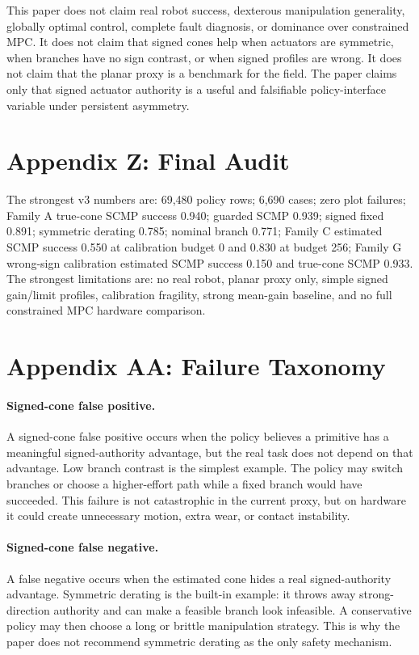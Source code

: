 \documentclass{article}
\begin{document}
This paper does not claim real robot success, dexterous manipulation generality, globally optimal control, complete fault diagnosis, or dominance over constrained MPC. It does not claim that signed cones help when actuators are symmetric, when branches have no sign contrast, or when signed profiles are wrong. It does not claim that the planar proxy is a benchmark for the field. The paper claims only that signed actuator authority is a useful and falsifiable policy-interface variable under persistent asymmetry.

\section{Appendix Z: Final Audit}

The strongest v3 numbers are: 69,480 policy rows; 6,690 cases; zero plot failures; Family A true-cone SCMP success 0.940; guarded SCMP 0.939; signed fixed 0.891; symmetric derating 0.785; nominal branch 0.771; Family C estimated SCMP success 0.550 at calibration budget 0 and 0.830 at budget 256; Family G wrong-sign calibration estimated SCMP success 0.150 and true-cone SCMP 0.933. The strongest limitations are: no real robot, planar proxy only, simple signed gain/limit profiles, calibration fragility, strong mean-gain baseline, and no full constrained MPC hardware comparison.

\section*{Appendix AA: Failure Taxonomy}

\paragraph{Signed-cone false positive.}
A signed-cone false positive occurs when the policy believes a primitive has a meaningful signed-authority advantage, but the real task does not depend on that advantage. Low branch contrast is the simplest example. The policy may switch branches or choose a higher-effort path while a fixed branch would have succeeded. This failure is not catastrophic in the current proxy, but on hardware it could create unnecessary motion, extra wear, or contact instability.

\paragraph{Signed-cone false negative.}
A false negative occurs when the estimated cone hides a real signed-authority advantage. Symmetric derating is the built-in example: it throws away strong-direction authority and can make a feasible branch look infeasible. A conservative policy may then choose a long or brittle manipulation strategy. This is why the paper does not recommend symmetric derating as the only safety mechanism.
\end{document}
